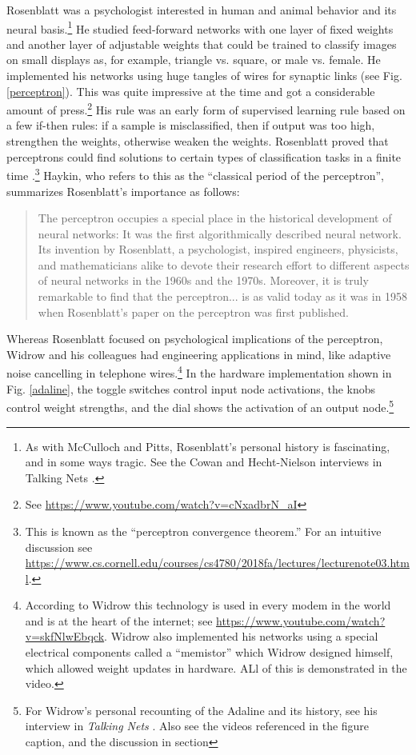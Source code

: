 Rosenblatt was a psychologist interested in human and animal behavior and its neural basis.\footnote{As with McCulloch and Pitts, Rosenblatt's personal history is fascinating, and in some ways tragic. See the Cowan and Hecht-Nielson interviews in Talking Nets \cite{anderson2000talking}.} He studied feed-forward networks with one layer of fixed weights and another layer of adjustable weights that could be trained to classify images on small displays as, for example, triangle vs. square, or male vs. female. He implemented his networks using huge tangles of wires for synaptic links (see Fig. \ref{perceptron}). This was quite impressive at the time and got a considerable amount of press.\footnote{See \url{https://www.youtube.com/watch?v=cNxadbrN_aI}} His rule was an early form of supervised learning rule based on a few if-then rules: if a sample is misclassified, then if output was too high, strengthen the weights, otherwise weaken the weights.  Rosenblatt proved that perceptrons could find solutions to certain types of classification tasks in a finite time \cite{rosenblatt1962comparison}.\footnote{This is known as the ``perceptron convergence theorem.'' For an intuitive discussion see \url{https://www.cs.cornell.edu/courses/cs4780/2018fa/lectures/lecturenote03.html}.} Haykin, who refers to this as the ``classical period of the perceptron'', summarizes Rosenblatt's importance as follows:
\begin{quotation}
The perceptron occupies a special place in the historical development of neural networks: It was the first algorithmically described neural network. Its invention by Rosenblatt, a psychologist, inspired engineers, physicists, and mathematicians alike to devote their research effort to different aspects of neural networks in the 1960s and the 1970s. Moreover, it is truly remarkable to find that the perceptron... is as valid today as it was in 1958 when Rosenblatt's paper on the perceptron was first published.
\end{quotation}

Whereas Rosenblatt focused on psychological implications of the perceptron, Widrow and his colleagues had engineering applications in mind, like adaptive noise cancelling in telephone wires.\footnote{According to Widrow this technology is used in every modem in the world and is at the heart of the internet; see \url{https://www.youtube.com/watch?v=skfNlwEbqck}. Widrow also implemented his networks using a special electrical components called a ``memistor'' which Widrow designed himself, which allowed weight updates in hardware. ALl of this is demonstrated in the video.} In the hardware implementation shown in Fig. \ref{adaline}, the toggle switches control input node activations, the knobs control weight strengths, and the dial shows the activation of an output node.\footnote{For Widrow's personal recounting of the Adaline and its history, see his interview in \emph{Talking Nets} \cite{anderson2000talking}. Also see the videos referenced in the figure caption, and the discussion in section }

